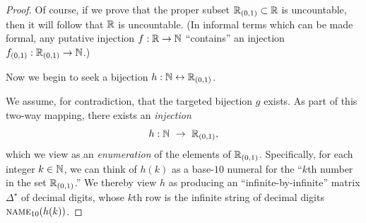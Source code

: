 \begin{proof}
\smallskip

Of course, if we prove that the proper subset $\mathbb{R}_{(0,1)} \subset \mathbb{R}$ is uncountable, then it will follow that $\mathbb{R}$ is uncountable.  (In informal terms which can be made formal, any putative injection $f: \mathbb{R} \rightarrow \mathbb{N}$ ``contains'' an injection $f_{(0,1)}: \mathbb{R}_{(0,1)} \rightarrow \mathbb{N}$.)

\bigskip

Now we begin to seek a bijection $h: \mathbb{N} \leftrightarrow \mathbb{R}_{(0,1)}$.

\smallskip

We assume, for contradiction, that the targeted bijection $g$ exists.  As part of this two-way mapping, there exists an {\em injection}
\[  h: \N \ \rightarrow \ \R_{(0,1)}, \]
which we view as an {\em enumeration} of the elements of $\mathbb{R}_{(0,1)}$.  Specifically, for each integer $k \in \mathbb{N}$, we can think of $h(k)$ as a base-$10$ numeral for the ``$k$th number in the set $\mathbb{R}_{(0,1)}$.''  We thereby view $h$ as producing an ``infinite-by-infinite'' matrix $\Delta^\star$ of decimal digits, whose $k$th row is the infinite string of decimal digits $\mbox{\sc name}_{10}(h(k))$.

\bigskip

\noindent {}


\end{proof}
